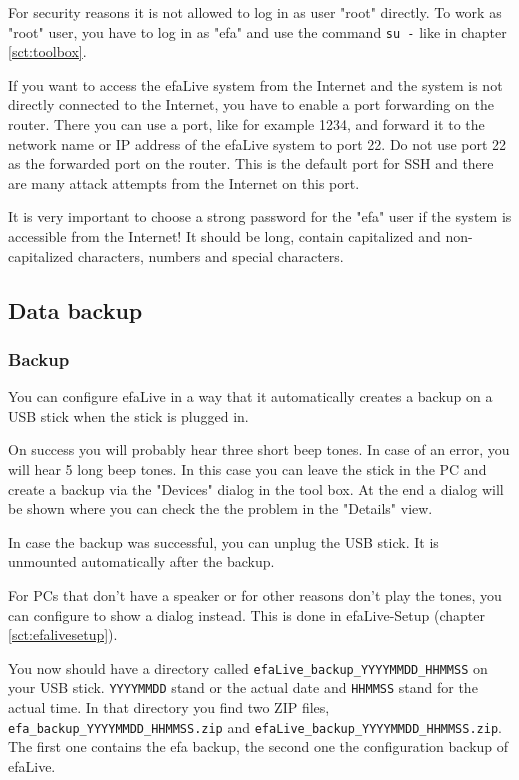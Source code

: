 \documentclass[a4paper,12pt,twoside]{article}
\begin{document}
For security reasons it is not allowed to log in as user
"root" directly. To work as
"root" user, you have to log in as
"efa" and use the command \texttt{su -} like in chapter \ref{sct:toolbox}.

If you want to access the efaLive system from the Internet and the
system is not directly connected to the Internet, you have to enable a
port forwarding on the router. There you can use a port, like for
example 1234, and forward it to the network name or IP address of the
efaLive system to port 22. Do not use port 22 as the forwarded port on
the router. This is the default port for SSH and there are many attack
attempts from the Internet on this port.

It is very important to choose a strong password for the
"efa" user if the system is accessible from
the Internet! It should be long, contain capitalized and
non-capitalized characters, numbers and special characters.


\subsection{Data backup}
\label{sct:data_backup}
\subsubsection{Backup}
\label{sct:backup}
You can configure efaLive in a way
that it automatically creates a backup on a USB stick when the stick is
plugged in.

On success you will probably hear three short beep tones. In case of an
error, you will hear 5 long beep tones. In this case you can leave the
stick in the PC and create a backup via the "Devices" dialog in the tool 
box. At the end a dialog will be shown where you can check the the problem
in the "Details" view.

In case the backup was successful, you can unplug the USB stick. It is
unmounted automatically after the backup.

For PCs that don't have a speaker or for other reasons
don't play the tones, you can configure to show a
dialog instead. This is done in efaLive-Setup (chapter \ref{sct:efalivesetup}).

You now should have a directory called
\texttt{efaLive\_backup\_YYYYMMDD\_HHMMSS} on your
USB stick. \texttt{YYYYMMDD} stand or the actual
date and \texttt{HHMMSS} stand for the actual
time. In that directory you find two ZIP files,
\texttt{efa\_backup\_YYYYMMDD\_HHMMSS.zip} and
\texttt{efaLive\_backup\_YYYYMMDD\_HHMMSS.zip}.
The first one contains the efa backup, the second one the configuration
backup of efaLive.
\end{document}

